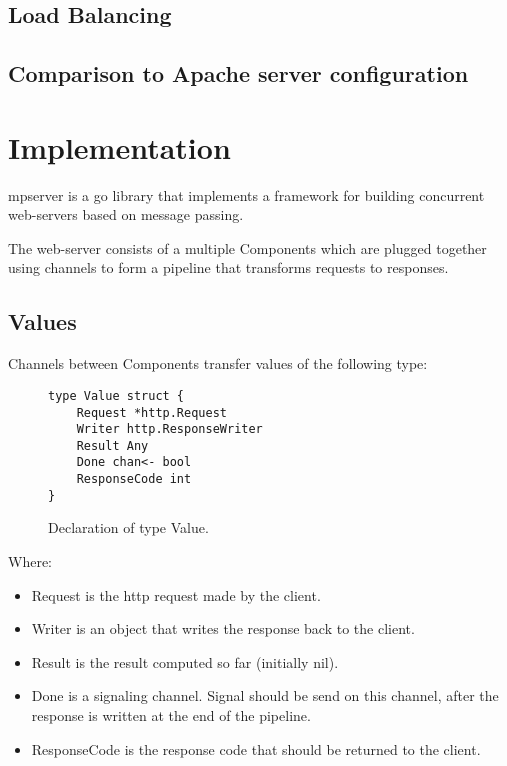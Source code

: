 \documentclass[12pt,a4paper]{article}
\begin{document}
\subsection{Load Balancing}

\subsection{Comparison to Apache server configuration}


\newpage
\section{Implementation}

mpserver is a go library that implements a framework for building 
concurrent web-servers based on message passing.

The web-server consists of a multiple Components which are plugged 
together using channels to form a pipeline that transforms requests 
to responses.

\subsection{Values} 
Channels between Components transfer values of the following type:

\begin{figure}[h]
\centering
\begin{lstlisting}
type Value struct {
    Request *http.Request
    Writer http.ResponseWriter
    Result Any
    Done chan<- bool
    ResponseCode int
}
\end{lstlisting}
\caption[scale=1.0]{Declaration of type Value.}
\label{fig:Value}
\end{figure}

Where:
\begin{itemize}
  \item Request is the http request made by the client.
  \item Writer is an object that writes the response back to the 	client.
  \item Result is the result computed so far (initially nil).
  \item Done is a signaling channel. Signal should be send on this channel,
		after the response is written at the end of the pipeline.
  \item ResponseCode is the response code that should be returned to the client.
\end{itemize}
\end{document}
